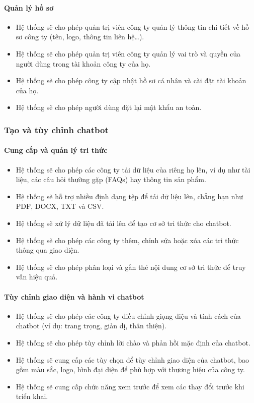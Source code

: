 \paragraph{Quản lý hồ sơ}
\begin{itemize}
    \item Hệ thống sẽ cho phép quản trị viên công ty quản lý thông tin chi tiết về hồ sơ công ty (tên, logo, thông tin liên hệ…).
    \item Hệ thống sẽ cho phép quản trị viên công ty quản lý vai trò và quyền của người dùng trong tài khoản công ty của họ.
    \item Hệ thống sẽ cho phép công ty cập nhật hồ sơ cá nhân và cài đặt tài khoản của họ.
    \item Hệ thống sẽ cho phép người dùng đặt lại mật khẩu an toàn.
\end{itemize}

\subsubsection{Tạo và tùy chỉnh chatbot}

\paragraph{Cung cấp và quản lý tri thức}
\begin{itemize}
    \item Hệ thống sẽ cho phép các công ty tải dữ liệu của riêng họ lên, ví dụ như tài liệu, các câu hỏi thường gặp (FAQs) hay thông tin sản phẩm.
    \item Hệ thống sẽ hỗ trợ nhiều định dạng tệp để tải dữ liệu lên, chẳng hạn như PDF, DOCX, TXT và CSV.
    \item Hệ thống sẽ xử lý dữ liệu đã tải lên để tạo cơ sở tri thức cho chatbot.
    \item Hệ thống sẽ cho phép các công ty thêm, chỉnh sửa hoặc xóa các tri thức thông qua giao diện.
    \item Hệ thống sẽ cho phép phân loại và gắn thẻ nội dung cơ sở tri thức để truy vấn hiệu quả.
\end{itemize}

\paragraph{Tùy chỉnh giao diện và hành vi chatbot}
\begin{itemize}
    \item Hệ thống sẽ cho phép các công ty điều chỉnh giọng điệu và tính cách của chatbot (ví dụ: trang trọng, giản dị, thân thiện).
    \item Hệ thống sẽ cho phép tùy chỉnh lời chào và phản hồi mặc định của chatbot.
    \item Hệ thống sẽ cung cấp các tùy chọn để tùy chỉnh giao diện của chatbot, bao gồm màu sắc, logo, hình đại diện để phù hợp với thương hiệu của công ty.
    \item Hệ thống sẽ cung cấp chức năng xem trước để xem các thay đổi trước khi triển khai.
\end{itemize}

